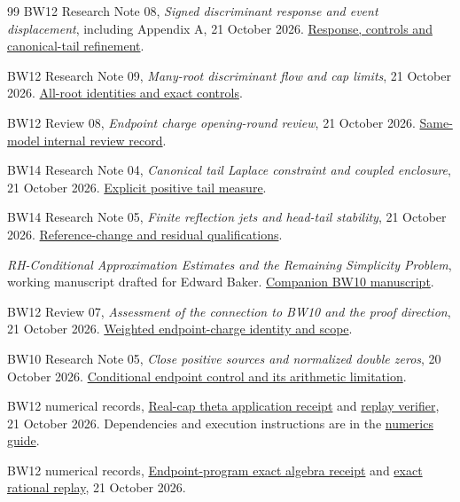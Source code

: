 \begin{thebibliography}{99}
BW12 Research Note 08,
\emph{Signed discriminant response and event displacement},
including Appendix A, 21 October 2026.
\href{../notes/08_SIGNED_DISCRIMINANT_RESPONSE_AND_EVENT_DISPLACEMENT_20261021.md}{Response, controls and canonical-tail refinement}.

BW12 Research Note 09,
\emph{Many-root discriminant flow and cap limits}, 21 October 2026.
\href{../notes/09_MANY_ROOT_DISCRIMINANT_FLOW_AND_CAP_LIMITS_20261021.md}{All-root identities and exact controls}.

BW12 Review 08,
\emph{Endpoint charge opening-round review}, 21 October 2026.
\href{../reviews/08_ENDPOINT_CHARGE_OPENING_ROUND_REVIEW_20261021.md}{Same-model internal review record}.

BW14 Research Note 04,
\emph{Canonical tail Laplace constraint and coupled enclosure},
21 October 2026.
\href{../../14_theta_source_transform_constraints/notes/04_CANONICAL_TAIL_LAPLACE_CONSTRAINT_AND_COUPLED_ENCLOSURE_20261021.md}{Explicit positive tail measure}.

BW14 Research Note 05,
\emph{Finite reflection jets and head-tail stability}, 21 October 2026.
\href{../../14_theta_source_transform_constraints/notes/05_FINITE_REFLECTION_JETS_AND_HEAD_TAIL_STABILITY_20261021.md}{Reference-change and residual qualifications}.

\emph{RH-Conditional Approximation Estimates and the Remaining
Simplicity Problem}, working manuscript drafted for Edward Baker.
\href{../../10_rh_implies_simple_zeros/manuscript/main.tex}{Companion BW10 manuscript}.

BW12 Review 07,
\emph{Assessment of the connection to BW10 and the proof direction},
21 October 2026.
\href{../reviews/07_BW10_INTEGRATION_AND_PROOF_DIRECTION_ASSESSMENT_20261021.md}{Weighted endpoint-charge identity and scope}.

BW10 Research Note 05,
\emph{Close positive sources and normalized double zeros},
20 October 2026.
\href{../../10_rh_implies_simple_zeros/notes/05_CLOSE_POSITIVE_SOURCES_AND_NORMALIZED_DOUBLE_ZEROS_20261020.md}{Conditional endpoint control and its arithmetic limitation}.

BW12 numerical records,
\href{../numerics/REAL_CAP_THETA_APPLICATION_20261021.json}{Real-cap theta application receipt}
and \href{../numerics/certify_real_cap_application.py}{replay verifier},
21 October 2026. Dependencies and execution instructions are in the
\href{../numerics/README.md}{numerics guide}.

BW12 numerical records,
\href{../numerics/ECE_EXACT_CONTROLS_20261021.json}{Endpoint-program exact algebra receipt}
and \href{../numerics/ece_exact_controls.py}{exact rational replay},
21 October 2026.

\end{thebibliography}
